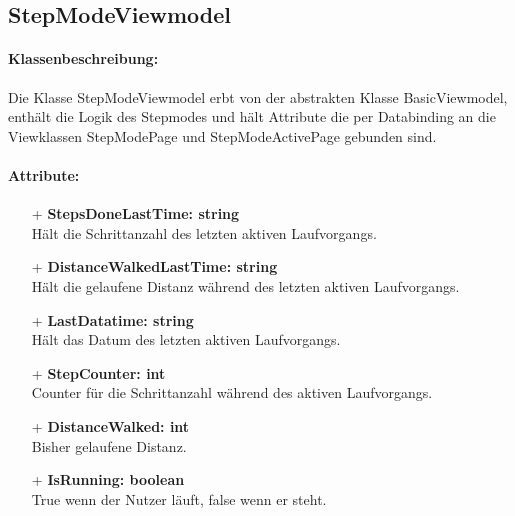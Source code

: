 \documentclass[a4paper,12pt]{article}
\begin{document}
\subsection{StepModeViewmodel}

\paragraph{Klassenbeschreibung:}
Die Klasse StepModeViewmodel erbt von der abstrakten Klasse BasicViewmodel, enthält die Logik des Stepmodes  und hält Attribute die per Databinding an die Viewklassen StepModePage und StepModeActivePage gebunden sind. 
\paragraph{Attribute:}
\begin{itemize}
	\item[+] \textbf{StepsDoneLastTime: string} \\ Hält die Schrittanzahl des letzten aktiven Laufvorgangs. 
	\item[+] \textbf{DistanceWalkedLastTime: string} \\ Hält die gelaufene Distanz während des letzten aktiven Laufvorgangs. 
	\item[+] \textbf{LastDatatime: string} \\ Hält das Datum des letzten aktiven Laufvorgangs. 
	\item[+] \textbf{StepCounter: int} \\ Counter für die Schrittanzahl während des aktiven Laufvorgangs. 
	\item[+] \textbf{DistanceWalked: int} \\  Bisher gelaufene Distanz. 
	\item[+] \textbf{IsRunning: boolean} \\ True wenn der Nutzer läuft, false wenn er steht. 
\end{itemize}
\end{document}
